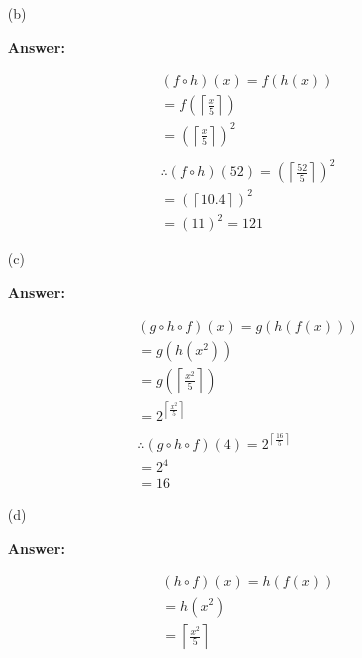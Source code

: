 \documentclass[14pt]{extreport}
\newcommand{\answer}[0]{\medskip \textbf{Answer:} \medskip}
\begin{document}
\begin{enumerate}

    \item[(b)]
    
        \answer

        \begin{align*}
            \left ( f \circ h \right )\left ( x \right ) = f\left ( h\left ( x \right ) \right ) \\
            = f\left (  \left \lceil \frac{x}{5} \right \rceil \right ) \\
            = \left (  \left \lceil \frac{x}{5} \right \rceil \right )^{2} \\\\
            \therefore \left ( f \circ h \right )\left ( 52 \right ) = \left (  \left \lceil \frac{52}{5} \right \rceil \right )^{2} \\
            = \left ( \left \lceil 10.4 \right \rceil \right )^{2} \\
            = \left ( 11 \right )^{2} = 121
        \end{align*}

    \item[(c)]
    
        \answer

        \begin{align*}
            \left ( g \circ h \circ f \right )\left ( x \right ) = g\left ( h\left ( f\left ( x \right ) \right ) \right ) \\
            = g\left ( h\left ( x^{2} \right ) \right ) \\
            = g\left (  \left \lceil \frac{x^2}{5} \right \rceil \right ) \\
            = 2^{\left \lceil \frac{x^2}{5} \right \rceil} \\\\
            \therefore \left ( g \circ h \circ f \right )\left ( 4 \right ) = 2^{\left \lceil \frac{16}{5} \right \rceil} \\
            = 2^{4} \\
            = 16
        \end{align*}

    \item[(d)]
    
        \answer

        \begin{align*}
            \left ( h \circ f \right )\left ( x \right ) = h\left ( f\left ( x \right ) \right ) \\
            = h\left ( x^{2} \right ) \\
            = \left \lceil \frac{x^{2}}{5} \right \rceil
        \end{align*}

\end{enumerate}
\end{document}
